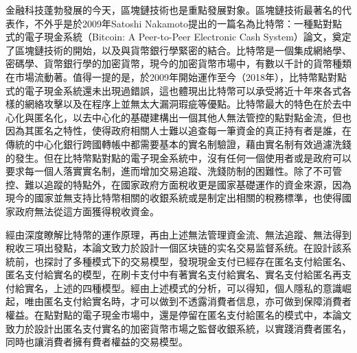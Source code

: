 \begin{cabstract}

	金融科技蓬勃發展的今天，區塊鏈技術也是重點發展對象。區塊鏈技術最著名的代表作，不外乎是於2009年Satoshi Nakamoto提出的一篇名為比特幣：一種點對點式的電子現金系統（Bitcoin: A Peer-to-Peer Electronic Cash System）論文\supercite{bitcoinpaper}，奠定了區塊鏈技術的開始，以及與貨幣銀行學緊密的結合。比特幣是一個集成網絡學、密碼學、貨幣銀行學的加密貨幣，現今的加密貨幣市場中，有數以千計的貨幣種類在市場流動著。值得一提的是，於2009年開始運作至今（2018年），比特幣點對點式的電子現金系統還未出現過錯誤，這也體現出比特幣可以承受將近十年來各式各樣的網絡攻擊以及在程序上並無太⼤漏洞瑕疵等優點。比特幣最大的特色在於去中心化與匿名化，以去中⼼化的基礎建構出⼀個其他人無法管控的點對點⾦流，但也因為其匿名之特性，使得政府相關人⼠難以追查每⼀筆資⾦的真正持有者是誰，在傳統的中心化銀行跨國轉帳中都需要基本的實名制驗證，藉由實名制有效過濾洗錢的發生。但在比特幣點對點的電子現金系統中，沒有任何一個使用者或是政府可以要求每一個人落實實名制，進而增加交易追蹤、洗錢防制的困難性。除了不可管控、難以追蹤的特點外，在國家政府方面稅收更是國家基礎運作的資⾦來源，因為現今的國家並無支持比特幣相關的收銀系統或是制定出相關的稅務標準，也使得國家政府無法從這方面獲得稅收資金。

	經由深度瞭解比特幣的運作原理，再由上述無法管理資金流、無法追蹤、無法得到稅收三項出發點，本論文致力於設計一個区块链的实名交易监督系统。在設計該系統前，也探討了多種模式下的交易模型，發現現金支付已經存在匿名支付給匿名、匿名支付給實名的模型，在刷卡支付中有著實名支付給實名、實名支付給匿名再支付給實名，上述的四種模型。經由上述模式的分析，可以得知，個人隱私的意識崛起，唯由匿名支付給實名時，才可以做到不透露消費者信息，亦可做到保障消費者權益。在點對點的電子現金市場中，還是停留在匿名支付給匿名的模式中，本論⽂致⼒於設計出匿名⽀付實名的加密貨幣市場之監督收銀系統，以實踐消費者匿名，同時也讓消費者擁有費者權益的交易模型。
\end{cabstract}

